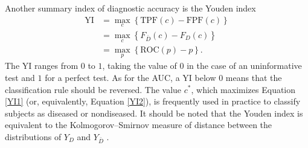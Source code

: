 Another summary index of diagnostic accuracy is the Youden index \citep{Shapiro99,Youden50}
\begin{align}
\text{YI} & =  \max_{c}\left\{\text{TPF}(c)-\text{FPF}(c)\right\} \label{YI1}\\
& =  \max_{c}\left\{F_{\bar{D}}\left(c\right) - F_{D}\left(c\right)\right\} \label{YI2}\\
& =  \max_{p}\left\{\text{ROC}(p)-p\right\} \label{YI3}.
\end{align}
The YI ranges from $0$ to $1$, taking the value of $0$ in the case of an uninformative test and $1$ for a perfect test. As for the AUC, a YI below $0$ means that the classification rule should be reversed. The value $c^{*}$, which maximizes Equation \eqref{YI1} (or, equivalently, Equation \eqref{YI2}), is frequently used in practice to classify subjects as diseased or nondiseased. It should be noted that the Youden index is equivalent to the Kolmogorov--Smirnov measure of distance between the distributions of $Y_{D}$ and $Y_{\bar{D}}$ \citep[p. 80]{Pepe03}.
